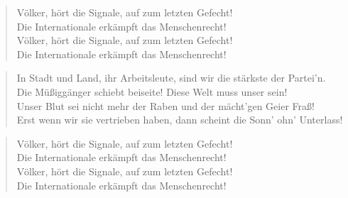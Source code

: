 \documentclass[9pt,a4paper,oneside, onecolumn]{article}
\begin{document}
\begin{verse}
Völker, hört die Signale, auf zum letzten Gefecht!\\
Die Internationale erkämpft das Menschenrecht!\\
Völker, hört die Signale, auf zum letzten Gefecht!\\
Die Internationale erkämpft das Menschenrecht!\\
\end{verse}

\begin{verse}
In Stadt und Land, ihr Arbeitsleute, sind wir die stärkste der Partei'n.\\
Die Müßiggänger schiebt beiseite! Diese Welt muss unser sein!\\
Unser Blut sei nicht mehr der Raben und der mächt'gen Geier Fraß!\\
Erst wenn wir sie vertrieben haben, dann scheint die Sonn' ohn' Unterlass!\\
\end{verse}

\begin{verse}
Völker, hört die Signale, auf zum letzten Gefecht!\\
Die Internationale erkämpft das Menschenrecht!\\
Völker, hört die Signale, auf zum letzten Gefecht!\\
Die Internationale erkämpft das Menschenrecht!\\
\end{verse}
\end{document}
